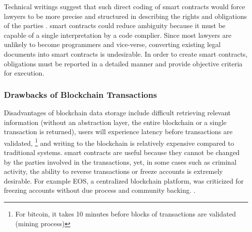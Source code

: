 Technical writings suggest
that such direct coding of \glspl{smart contract} would force lawyers to be more precise and
structured in describing the rights and obligations of the parties \cite{stepWolf}. \Glspl{smart
contract} could reduce ambiguity because it must be capable of a single interpretation by a code complier. Since most lawyers are unlikely to become programmers and vice-verse, converting existing legal documents into \glspl{smart contract} is undesirable. In order to create \glspl{smart contract}, obligations must be reported in a  detailed manner and provide objective criteria for execution.


\subsubsection{Drawbacks of Blockchain Transactions}

	
Disadvantages of \gls{blockchain} data storage include difficult retrieving relevant information (without an abstraction layer, the entire \gls{blockchain} or a single transaction is returned), users will experience latency before transactions are validated, 	\footnote{For bitcoin, it takes 10 minutes before blocks of transactions are validated (mining process)} and writing to the blockchain is relatively expensive compared to traditional systems. \Glspl{smart contract} are useful because they cannot be changed by the parties involved in the transactions, yet, in some cases such as criminal activity, the ability to reverse transactions or freeze accounts is extremely desirable. For example EOS, a centralized \gls{blockchain} platform, was criticized for freezing accounts without due process and community backing. \cite{EOS:Online}.



\newpage
%
%